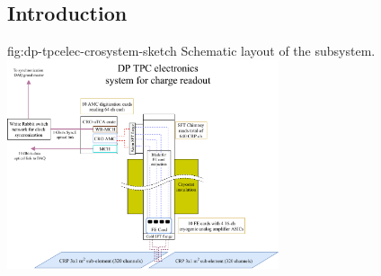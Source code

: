 \subsection{Introduction}
\label{ssec:dp-tpcelec-intro}

\begin{dunefigure}{fig:dp-tpcelec-crosystem-sketch}
{Schematic layout of the   subsystem.}
\includegraphics[width=0.6\textwidth]{graphics/dp-tpcelec-crosystem-sketch}
\end{dunefigure}


